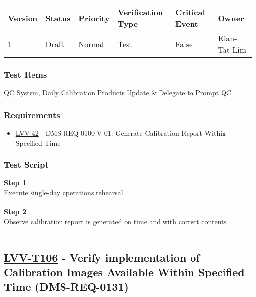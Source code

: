 \begin{longtable}[]{@{}llllll@{}}
\toprule
Version & Status & Priority & Verification Type & Critical Event &
Owner\tabularnewline
\midrule
\endhead
1 & Draft & Normal & Test & False & Kian-Tat Lim\tabularnewline
\bottomrule
\end{longtable}

\hypertarget{test-items-81}{%
\subsubsection{Test Items}\label{test-items-81}}

QC System, Daily Calibration Products Update \& Delegate to Prompt QC

\hypertarget{requirements-82}{%
\subsubsection{Requirements}\label{requirements-82}}

\begin{itemize}
\tightlist
\item
  \href{https://jira.lsstcorp.org/browse/LVV-42}{LVV-42} -
  DMS-REQ-0100-V-01: Generate Calibration Report Within Specified Time
\end{itemize}

\hypertarget{test-script-82}{%
\subsubsection{Test Script}\label{test-script-82}}

\textbf{Step 1}\\
Execute single-day operations rehearsal\\
~\\
\textbf{Step 2}\\
Observe calibration report is generated on time and with correct
contents\\
~\\

\hypertarget{lvv-t106---verify-implementation-of-calibration-images-available-within-specified-time-dms-req-0131}{%
\subsection{\texorpdfstring{\href{https://jira.lsstcorp.org/secure/Tests.jspa\#/testCase/LVV-T106}{LVV-T106}
- Verify implementation of Calibration Images Available Within Specified
Time
(DMS-REQ-0131)}{LVV-T106 - Verify implementation of Calibration Images Available Within Specified Time (DMS-REQ-0131)}}\label{lvv-t106---verify-implementation-of-calibration-images-available-within-specified-time-dms-req-0131}}

